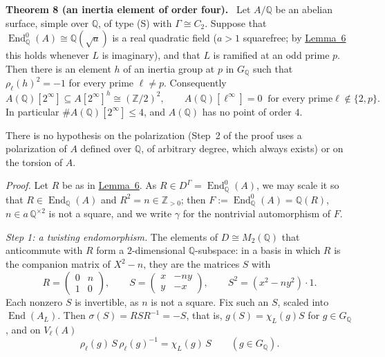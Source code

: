 \documentclass[11pt]{article}
\newenvironment{statement}[1]{\par\medskip\noindent\phantomsection\textbf{#1}\ }{\par\medskip}
\newcommand{\Q}{\mathbb Q}
\newcommand{\Z}{\mathbb Z}
\DeclareMathOperator{\End}{End}
\begin{document}
\begin{statement}{Theorem 8 (an inertia element of order four).}\label{thm-inertia}
Let \(A/\Q\) be an abelian surface, simple over \(\Q\), of type (S) with \(\Gamma\cong C_2\). Suppose that
\(\End^0_{\Q}(A)\cong\Q(\sqrt a)\) is a real quadratic field (\(a>1\) squarefree; by \hyperref[lemma-rm]{Lemma~6}
this holds whenever \(L\) is imaginary), and that \(L\) is ramified at an odd prime \(p\). Then there is an element
\(h\) of an inertia group at \(p\) in \(G_{\Q}\) such that \(\rho_\ell(h)^2=-1\) for every prime \(\ell\neq p\).
Consequently
\[A(\Q)[2^\infty]\subseteq A[2^\infty]^{h}\cong(\Z/2)^2,\qquad A(\Q)[\ell^\infty]=0\ \text{ for every prime
}\ell\notin\{2,p\}.\]
In particular \(\#A(\Q)[2^\infty]\le4\), and \(A(\Q)\) has no point of order \(4\).
\end{statement}

There is no hypothesis on the polarization (Step~2 of the proof uses a polarization of \(A\) defined over \(\Q\), of
arbitrary degree, which always exists) or on the torsion of \(A\).

\emph{Proof.} Let \(R\) be as in \hyperref[lemma-rm]{Lemma~6}. As \(R\in D^\Gamma=\End^0_{\Q}(A)\), we may scale it
so that \(R\in\End_{\Q}(A)\) and \(R^2=n\in\Z_{>0}\); then \(F:=\End^0_{\Q}(A)=\Q(R)\), \(n\in a\,\Q^{\times2}\) is not
a square, and we write \(\gamma\) for the nontrivial automorphism of \(F\).

\emph{Step 1: a twisting endomorphism.} The elements of \(D\cong M_2(\Q)\) that anticommute with \(R\) form a
\(2\)-dimensional \(\Q\)-subspace: in a basis in which \(R\) is the companion matrix of \(X^2-n\), they are the
matrices \(S\) with
\[R=\begin{pmatrix}0&n\\1&0\end{pmatrix},\qquad S=\begin{pmatrix}x&-ny\\y&-x\end{pmatrix},\qquad
S^2=(x^2-ny^2)\cdot1 .\]
Each nonzero \(S\) is invertible, as \(n\) is not a square. Fix such an \(S\), scaled into \(\End(A_L)\). Then
\(\sigma(S)=RSR^{-1}=-S\), that is, \(g(S)=\chi_L(g)S\) for \(g\in G_{\Q}\), and on \(V_\ell(A)\)
\[\rho_\ell(g)\,S\,\rho_\ell(g)^{-1}=\chi_L(g)\,S\qquad(g\in G_{\Q}).\tag{2}\]
\end{document}
